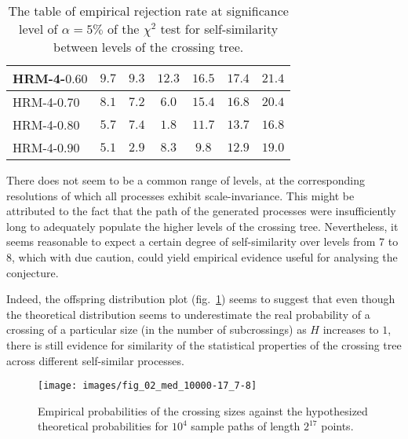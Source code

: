 \begin{table}[h]
\begin{center}
\begin{tabular}{l||c|c|c|c|c|c|}
	HRM-4-$0.60$ 	& $9.7$ &  $\mathbf{9.3}$ & $12.3$ & $16.5$ & $17.4$ & $21.4$ \\ \hline
	HRM-4-$0.70$ 	& $8.1$ &  $7.2$ &  $\mathbf{6.0}$ & $15.4$ & $16.8$ & $20.4$ \\ \hline
	HRM-4-$0.80$ 	& $5.7$ &  $7.4$ &  $\mathbf{1.8}$ & $11.7$ & $13.7$ & $16.8$ \\ \hline
	HRM-4-$0.90$ 	& $5.1$ &  $\mathbf{2.9}$ &  $8.3$ &  $9.8$ & $12.9$ & $19.0$ \\ \hline\hline

 	\end{tabular}
	\caption{The table of empirical rejection rate at significance level of $\alpha = 5\%$
	of the $\chi^2$ test for self-similarity between levels of the crossing tree. }
\label{tbl:chi_sq_test_for_all_01}
\end{center}\end{table}
There does not seem to be a common range of levels, at the corresponding resolutions of which
all processes exhibit scale-invariance. This might be attributed to the fact that the path
of the generated processes were insufficiently long to adequately populate the higher
levels of the crossing tree. Nevertheless, it seems reasonable to expect a certain degree
of self-similarity over levels from 7 to 8, which with due caution, could yield empirical
evidence useful for analysing the conjecture.

Indeed, the offspring distribution plot (fig.~\ref{fig:all_xing_probs}) seems to
suggest that even though the theoretical distribution seems to underestimate the real
probability of a crossing of a particular size (in the number of subcrossings) as $H$
increases to $1$, there is still evidence for similarity of the statistical properties
of the crossing tree across different self-similar processes.
\begin{figure}[htb]\begin{center}
    \texttt{[image: images/fig\_02\_med\_10000-17\_7-8]}
    \caption{Empirical probabilities of the crossing sizes against the hypothesized
    theoretical probabilities for $10^4$ sample paths of length $2^{17}$ points.}
\label{fig:all_xing_probs}
\end{center}\end{figure}

